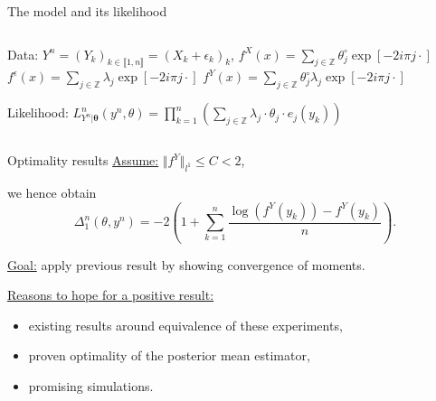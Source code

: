 \documentclass[10pt]{beamer}
\begin{document}
\begin{frame}{The model and its likelihood}

\begin{columns}
	\begin{column}[T]{.4\textwidth}%
		\begin{block}{Data:}
			$Y^{n} = \left(Y_{k}\right)_{k \in \llbracket1, n\rrbracket} = \left(X_{k} + \epsilon_{k}\right)_{k}$,
			$f^{X}(x) = \sum\limits_{j \in \mathbb{Z}} \theta^{\circ}_{j} \exp[-2 i \pi j \cdot]$
			$f^{\epsilon}(x) = \sum\limits_{j \in \mathbb{Z}} \lambda_{j} \exp[-2 i \pi j \cdot]$
			$f^{Y}(x) = \sum\limits_{j \in \mathbb{Z}} \theta^{\circ}_{j} \lambda_{j} \exp[-2 i \pi j \cdot]$
		\end{block}
		\begin{block}{Likelihood:}
			$L_{Y^{n} \vert \boldsymbol{\theta}}^{n}(y^{n}, \theta) = \prod\limits_{k=1}^{n}\left(\sum\limits_{j \in \mathbb{Z}} \lambda_{j} \cdot \theta_{j} \cdot e_{j}(y_{k})\right)$
		\end{block}
	\end{column}
	\begin{column}[T]{.7\textwidth}%
		\begin{center}
		\end{center}
	\end{column}
\end{columns}
\end{frame}

\begin{frame}{Optimality results}
\underline{Assume:} $\Vert f^{Y} \Vert_{l^{1}} \leq C < 2$,

we hence obtain
\[\Delta_{1}^{n}(\theta, y^{n}) = -2\left(1 + \sum\limits_{k = 1}^{n} \frac{\log(f^{Y}(y_{k})) - f^{Y}(y_{k})}{n}\right).\]

\bigskip

\underline{Goal:} apply previous result by showing convergence of moments.

\bigskip

\underline{Reasons to hope for a positive result:}
\begin{itemize}
\item existing results around equivalence of these experiments,
\item proven optimality of the posterior mean estimator,
\item promising simulations.
\end{itemize}
\end{frame}
\end{document}
